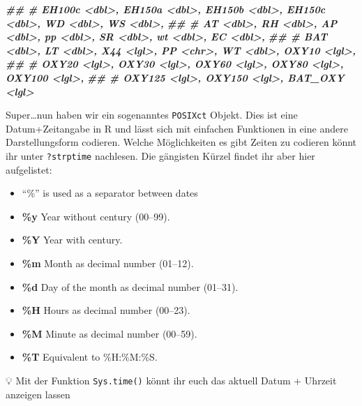 \documentclass[
]{article}
\newenvironment{Shaded}{\begin{snugshade}}{\end{snugshade}}
\newcommand{\DocumentationTok}[1]{\textcolor[rgb]{0.56,0.35,0.01}{\textbf{\textit{#1}}}}
\providecommand{\tightlist}{%
  \setlength{\itemsep}{0pt}\setlength{\parskip}{0pt}}
\begin{document}
\begin{Shaded}
\begin{Highlighting}[]
\DocumentationTok{\#\# \#   EH100c \textless{}dbl\textgreater{}, EH150a \textless{}dbl\textgreater{}, EH150b \textless{}dbl\textgreater{}, EH150c \textless{}dbl\textgreater{}, WD \textless{}dbl\textgreater{}, WS \textless{}dbl\textgreater{},}
\DocumentationTok{\#\# \#   AT \textless{}dbl\textgreater{}, RH \textless{}dbl\textgreater{}, AP \textless{}dbl\textgreater{}, pp \textless{}dbl\textgreater{}, SR \textless{}dbl\textgreater{}, wt \textless{}dbl\textgreater{}, EC \textless{}dbl\textgreater{},}
\DocumentationTok{\#\# \#   BAT \textless{}dbl\textgreater{}, LT \textless{}dbl\textgreater{}, X44 \textless{}lgl\textgreater{}, PP \textless{}chr\textgreater{}, WT \textless{}dbl\textgreater{}, OXY10 \textless{}lgl\textgreater{},}
\DocumentationTok{\#\# \#   OXY20 \textless{}lgl\textgreater{}, OXY30 \textless{}lgl\textgreater{}, OXY60 \textless{}lgl\textgreater{}, OXY80 \textless{}lgl\textgreater{}, OXY100 \textless{}lgl\textgreater{},}
\DocumentationTok{\#\# \#   OXY125 \textless{}lgl\textgreater{}, OXY150 \textless{}lgl\textgreater{}, BAT\_OXY \textless{}lgl\textgreater{}}
\end{Highlighting}
\end{Shaded}

Super\ldots nun haben wir ein sogenanntes \texttt{POSIXct} Objekt. Dies ist eine Datum+Zeitangabe in R und lässt sich mit einfachen Funktionen in eine andere Darstellungsform codieren. Welche Möglichkeiten es gibt Zeiten zu codieren könnt ihr unter \texttt{?strptime} nachlesen. Die gängisten Kürzel findet ihr aber hier aufgelistet:

\begin{itemize}
\tightlist
\item
  ``\%'' is used as a separator between dates 🚨
\item
  \textbf{\%y} Year without century (00--99).
\item
  \textbf{\%Y} Year with century.
\item
  \textbf{\%m} Month as decimal number (01--12).
\item
  \textbf{\%d} Day of the month as decimal number (01--31).
\item
  \textbf{\%H} Hours as decimal number (00--23).
\item
  \textbf{\%M} Minute as decimal number (00--59).
\item
  \textbf{\%T} Equivalent to \%H:\%M:\%S.
\end{itemize}

💡 Mit der Funktion \texttt{Sys.time()} könnt ihr euch das aktuell Datum + Uhrzeit anzeigen lassen
\end{document}
